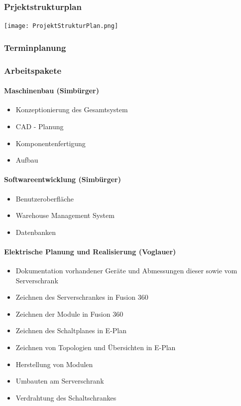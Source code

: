 \subsubsection{Prjektstrukturplan}
\vspace{5mm}

\bgroup
    \centering
    \texttt{[image: ProjektStrukturPlan.png]}
\egroup

\newpage
\subsubsection{Terminplanung}

\newpage

\subsubsection{Arbeitspakete}

\paragraph{Maschinenbau (Simbürger)}
\begin{itemize}
    \item Konzeptionierung des Gesamtsystem
    \item CAD - Planung
    \item Komponentenfertigung
    \item Aufbau 
\end{itemize}

\paragraph{Softwareentwicklung (Simbürger)}
\begin{itemize}
    \item Benutzeroberfläche
    \item Warehouse Management System
    \item Datenbanken
\end{itemize}

\paragraph{Elektrische Planung und Realisierung (Voglauer)}
\begin{itemize}
    \item Dokumentation vorhandener Geräte und Abmessungen dieser sowie vom Serverschrank 
    \item Zeichnen des Serverschrankes in Fusion 360
    \item Zeichnen der Module in Fusion 360
    \item Zeichnen des Schaltplanes in E-Plan 
    \item Zeichnen von Topologien und Übersichten in E-Plan 
    \item Herstellung von Modulen 
    \item Umbauten am Serverschrank
    \item Verdrahtung des Schaltschrankes
\end{itemize}





